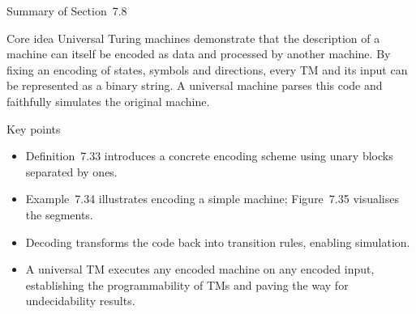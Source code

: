 \begin{frame}[t]{Summary of Section 7.8}
  \begin{tblock}{Core idea}
    Universal Turing machines demonstrate that the description of a
    machine can itself be encoded as data and processed by another
    machine.  By fixing an encoding of states, symbols and directions,
    every TM and its input can be represented as a binary string.  A
    universal machine parses this code and faithfully simulates the
    original machine.
  \end{tblock}
  \begin{tblock}{Key points}
    \begin{itemize}
      \item Definition 7.33 introduces a concrete encoding scheme using
        unary blocks separated by ones.
      \item Example 7.34 illustrates encoding a simple machine; Figure 7.35
        visualises the segments.
      \item Decoding transforms the code back into transition rules,
        enabling simulation.
      \item A universal TM executes any encoded machine on any encoded
        input, establishing the programmability of TMs and paving the
        way for undecidability results.
    \end{itemize}
  \end{tblock}
  \label{fr:7.8-13}
\end{frame}

